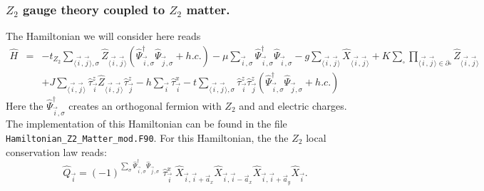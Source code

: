 \subsubsection{$Z_2$ gauge theory coupled to $Z_2$ matter.   }
\label{Z2.Sec}
The Hamiltonian we will consider here reads
\begin{eqnarray}
	\hat{H} & = & -  t_{Z_2} \sum_{\langle \vec{i}, \vec{j} \rangle, \sigma } \hat{Z}_{\langle \vec{i}, \vec{j} \rangle}
	\left(\hat{\Psi}^{\dagger}_{\vec{i},\sigma} \hat{\Psi}^{\phantom{\dagger}}_{\vec{j},\sigma}   + h.c. \right) - \mu \sum_{\vec{i},\sigma} \hat{\Psi}^{\dagger}_{\vec{i},\sigma} \hat{\Psi}^{\phantom{\dagger}}_{\vec{i},\sigma}  
	-g \sum_{\langle \vec{i}, \vec{j} \rangle } \hat{X}_{\langle \vec{i}, \vec{j} \rangle }  +
	  K \sum_{\square} \prod_{\langle \vec{i}, \vec{j} \rangle \in \partial \square} \hat{Z}_{\langle \vec{i}, \vec{j} \rangle}  \nonumber \\
	& &  + J  \sum_{\langle \vec{i}, \vec{j} \rangle}  \hat{\tau}^z_{\vec{i}}  \hat{Z}_{\langle \vec{i}, \vec{j} \rangle} \hat{\tau}^z_{\vec{j}}   
	      -  h \sum_{ \vec{i} } \hat{\tau}^x_{\vec{i}}   - t  \sum_{\langle \vec{i}, \vec{j} \rangle, \sigma }   \hat{\tau}^z_{\vec{i}}   \hat{\tau}^z_{\vec{j}}  \left( \hat{\Psi}^{\dagger}_{\vec{i},\sigma} \hat{\Psi}^{\phantom{\dagger}}_{\vec{j},\sigma} 	+ h.c. \right)
\end{eqnarray}  
Here the  $\hat{\Psi}^{\dagger}_{\vec{i},\sigma}$  creates an orthogonal fermion with $Z_2$ and  and electric charges.    
The implementation of this Hamiltonian can be found in the file \texttt{Hamiltonian\_Z2\_Matter\_mod.F90}.
 For this Hamiltonian, the the $Z_2$ local conservation law reads: 
\begin{equation}
	\hat{Q}_{\vec{i}} =  (-1)^{\sum_{\sigma} \hat{\Psi}^{\dagger}_{\vec{i},\sigma} \hat{\Psi}^{\phantom{\dagger}}_{\vec{j},\sigma}   } 
	\;  \hat{\tau}^{x}_{\vec{i}}  \; \hat{X}_{\vec{i},\vec{i} +  \vec{a}_x} \hat{X}_{\vec{i},\vec{i} -  \vec{a}_x} \hat{X}_{\vec{i},\vec{i} +  \vec{a}_y} \hat{X}_{\vec{i}}.
\end{equation} 

